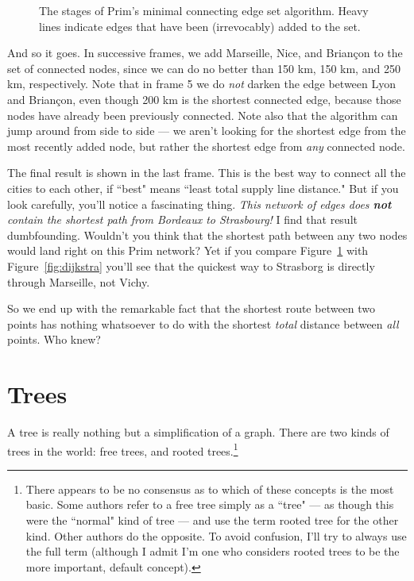 \begin{figure}[ht]
\begin{custommargins}{-2.4cm}{-2.8cm}
\caption{The stages of Prim's minimal connecting edge set algorithm. Heavy
lines indicate edges that have been (irrevocably) added to the set.}
\label{prim}
\end{custommargins}
\end{figure}

\afterpage{\clearpage}

And so it goes. In successive frames, we add Marseille, Nice, and
Brian\c{c}on to the set of connected nodes, since we can do no better than
150 km, 150 km, and 250 km, respectively. Note that in frame 5 we do
\textit{not} darken the edge between Lyon and Brian\c{c}on, even though 200
km is the shortest connected edge, because those nodes have already been
previously connected. Note also that the algorithm can jump around from
side to side --- we aren't looking for the shortest edge from the most
recently added node, but rather the shortest edge from \textit{any}
connected node.

The final result is shown in the last frame. This is the best way to
connect all the cities to each other, if ``best" means ``least total supply
line distance." But if you look carefully, you'll notice a fascinating
thing. \textit{This network of edges does \textbf{not} contain the shortest
path from Bordeaux to Strasbourg!} I find that result dumbfounding.
Wouldn't you think that the shortest path between any two nodes would land
right on this Prim network? Yet if you compare Figure~\ref{prim} with
Figure~\ref{fig:dijkstra} you'll see that the quickest way to Strasborg is
directly through Marseille, not Vichy.

So we end up with the remarkable fact that the shortest route between two
points has nothing whatsoever to do with the shortest \textit{total}
distance between \textit{all} points. Who knew?






\section{Trees}

A tree is really nothing but a simplification of a graph. There are two
kinds of trees in the world: free trees, and rooted trees.\footnote{There
appears to be no consensus as to which of these concepts is the most basic.
Some authors refer to a free tree simply as a ``tree" --- as though this
were the ``normal" kind of tree --- and use the term rooted tree for the
other kind. Other authors do the opposite. To avoid confusion, I'll try to
always use the full term (although I admit I'm one who considers rooted
trees to be the more important, default concept).}

